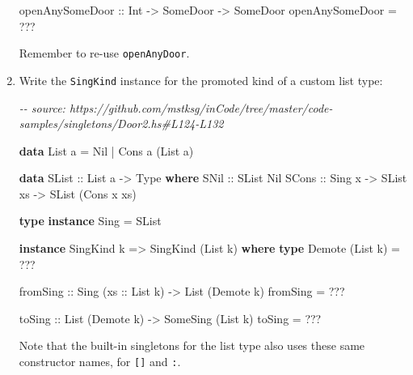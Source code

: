\documentclass[]{article}
\newenvironment{Shaded}{}{}
\newcommand{\CommentTok}[1]{\textcolor[rgb]{0.38,0.63,0.69}{\textit{#1}}}
\newcommand{\DataTypeTok}[1]{\textcolor[rgb]{0.56,0.13,0.00}{#1}}
\newcommand{\KeywordTok}[1]{\textcolor[rgb]{0.00,0.44,0.13}{\textbf{#1}}}
\newcommand{\NormalTok}[1]{#1}
\newcommand{\OperatorTok}[1]{\textcolor[rgb]{0.40,0.40,0.40}{#1}}
\newcommand{\OtherTok}[1]{\textcolor[rgb]{0.00,0.44,0.13}{#1}}
\begin{document}
\begin{enumerate}
\begin{Shaded}
\begin{Highlighting}[]
\OtherTok{openAnySomeDoor ::} \DataTypeTok{Int} \OtherTok{{-}>} \DataTypeTok{SomeDoor} \OtherTok{{-}>} \DataTypeTok{SomeDoor}
\NormalTok{openAnySomeDoor }\OtherTok{=} \OperatorTok{???}
\end{Highlighting}
\end{Shaded}

  Remember to re-use \texttt{openAnyDoor}.
\item
  Write the \texttt{SingKind} instance for the promoted kind of a custom list
  type:

\begin{Shaded}
\begin{Highlighting}[]
\CommentTok{{-}{-} source: https://github.com/mstksg/inCode/tree/master/code{-}samples/singletons/Door2.hs\#L124{-}L132}

\KeywordTok{data} \DataTypeTok{List}\NormalTok{ a }\OtherTok{=} \DataTypeTok{Nil} \OperatorTok{|} \DataTypeTok{Cons}\NormalTok{ a (}\DataTypeTok{List}\NormalTok{ a)}

\KeywordTok{data} \DataTypeTok{SList}\OtherTok{ ::} \DataTypeTok{List}\NormalTok{ a }\OtherTok{{-}>} \DataTypeTok{Type} \KeywordTok{where}
    \DataTypeTok{SNil}\OtherTok{  ::} \DataTypeTok{SList} \DataTypeTok{\textquotesingle{}Nil}
    \DataTypeTok{SCons}\OtherTok{ ::} \DataTypeTok{Sing}\NormalTok{ x }\OtherTok{{-}>} \DataTypeTok{SList}\NormalTok{ xs }\OtherTok{{-}>} \DataTypeTok{SList}\NormalTok{ (}\DataTypeTok{\textquotesingle{}Cons}\NormalTok{ x xs)}

\KeywordTok{type} \KeywordTok{instance} \DataTypeTok{Sing} \OtherTok{=} \DataTypeTok{SList}

\KeywordTok{instance} \DataTypeTok{SingKind}\NormalTok{ k }\OtherTok{=>} \DataTypeTok{SingKind}\NormalTok{ (}\DataTypeTok{List}\NormalTok{ k) }\KeywordTok{where}
    \KeywordTok{type} \DataTypeTok{Demote}\NormalTok{ (}\DataTypeTok{List}\NormalTok{ k) }\OtherTok{=} \OperatorTok{???}

\OtherTok{    fromSing ::} \DataTypeTok{Sing}\NormalTok{ (}\OtherTok{xs ::} \DataTypeTok{List}\NormalTok{ k) }\OtherTok{{-}>} \DataTypeTok{List}\NormalTok{ (}\DataTypeTok{Demote}\NormalTok{ k)}
\NormalTok{    fromSing }\OtherTok{=} \OperatorTok{???}

\OtherTok{    toSing ::} \DataTypeTok{List}\NormalTok{ (}\DataTypeTok{Demote}\NormalTok{ k) }\OtherTok{{-}>} \DataTypeTok{SomeSing}\NormalTok{ (}\DataTypeTok{List}\NormalTok{ k)}
\NormalTok{    toSing }\OtherTok{=} \OperatorTok{???}
\end{Highlighting}
\end{Shaded}

  Note that the built-in singletons for the list type also uses these same
  constructor names, for \texttt{{[}{]}} and \texttt{:}.
\end{enumerate}
\end{document}

